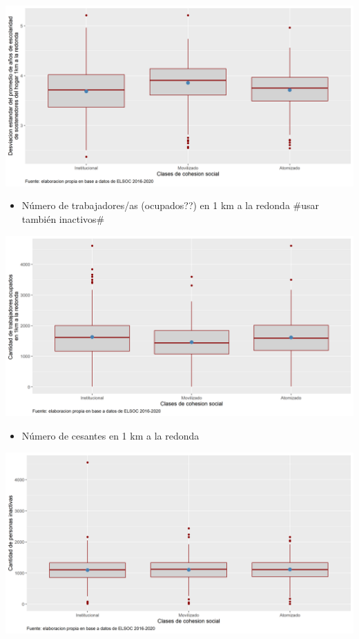 \documentclass[
  12pt,
]{book}
\providecommand{\tightlist}{%
  \setlength{\itemsep}{0pt}\setlength{\parskip}{0pt}}
\begin{document}
\begin{center}\includegraphics[width=1\linewidth,height=1\textheight]{output/graphs/clase-sdeduc} \end{center}

\begin{itemize}
\tightlist
\item
  Número de trabajadores/as (ocupados??) en 1 km a la redonda \#usar también inactivos\#
\end{itemize}

\begin{center}\includegraphics[width=1\linewidth,height=1\textheight]{output/graphs/clase-trab} \end{center}

\begin{itemize}
\tightlist
\item
  Número de cesantes en 1 km a la redonda
\end{itemize}

\begin{center}\includegraphics[width=1\linewidth,height=1\textheight]{output/graphs/clase-cesantes} \end{center}
\end{document}
